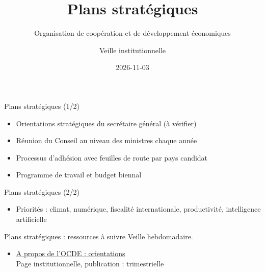 \documentclass[aspectratio=169,11pt]{beamer}
\title{Plans stratégiques}
\subtitle{Organisation de coopération et de développement économiques}
\author{Veille institutionnelle}
\date{2026-11-03}
\begin{document}
\begin{frame}\titlepage\end{frame}

\begin{frame}{Plans stratégiques (1/2)}
\begin{itemize}
\item Orientations stratégiques du secrétaire général (à vérifier)
\item Réunion du Conseil au niveau des ministres chaque année
\item Processus d'adhésion avec feuilles de route par pays candidat
\item Programme de travail et budget biennal
\end{itemize}
\end{frame}

\begin{frame}{Plans stratégiques (2/2)}
\begin{itemize}
\item Priorités : climat, numérique, fiscalité internationale, productivité, intelligence artificielle
\end{itemize}
\end{frame}

\begin{frame}{Plans stratégiques : ressources à suivre}
\small
Veille hebdomadaire.
\begin{itemize}
\item \href{https://www.oecd.org/en/about.html}{A propos de l'OCDE : orientations}\\{\footnotesize Page institutionnelle, publication : trimestrielle}
\end{itemize}
\end{frame}
\end{document}
